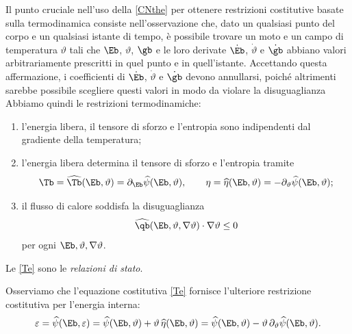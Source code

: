 Il punto cruciale nell'uso della \eqref{CNthe} per ottenere  restrizioni costitutive basate sulla termodinamica consiste nell'osservazione che, dato un qualsiasi punto del corpo e un qualsiasi istante di tempo, è possibile trovare un moto e un campo di temperatura $\vartheta$ tali che $\Eb$, $\vartheta$, $\gb$ e le loro derivate $\dot{\Eb}$, $\dot\vartheta$ e $\dot{\gb}$ abbiano valori  arbitrariamente prescritti in quel punto e in quell'istante.  Accettando questa affermazione, i coefficienti di $\dot\Eb$, $\dot \vartheta$ e $\dot\gb$ devono annullarsi, poiché altrimenti sarebbe possibile scegliere questi valori in modo da violare la disuguaglianza 
Abbiamo quindi le restrizioni termodinamiche:
\begin{enumerate}
	\item l'energia libera, il tensore di sforzo e l'entropia sono indipendenti dal gradiente della temperatura;
	\item l'energia libera determina il tensore di sforzo e l'entropia tramite 
	\begin{equation}\label{Te}
		\Tb =\widehat{\Tb}(\Eb, \vartheta)=\partial_\Eb \widehat{\psi}(\Eb, \vartheta), \qquad \eta= \widehat{\eta}(\Eb, \vartheta)=-\partial_\vartheta \widehat{\psi}(\Eb, \vartheta);
	\end{equation}
\item il flusso di calore soddisfa la disuguaglianza
\begin{equation}\label{qthe}
 \widehat{\qb}(\Eb, \vartheta, \nabla\vartheta)\cdot \nabla\vartheta\leq 0
\end{equation}
per ogni $\Eb, \vartheta, \nabla\vartheta$.
\end{enumerate}
Le \eqref{Te} sono le \textit{relazioni di stato}.

Osserviamo che l'equazione costitutiva \eqref{Te} fornisce l'ulteriore restrizione costitutiva per l'energia interna:
\begin{equation}\label{epsthe}
	\varepsilon=\widehat{\psi}(\Eb, \varepsilon)=\widehat{\psi}(\Eb, \vartheta)+\vartheta\,\widehat{\eta}(\Eb, \vartheta)=\widehat{\psi}(\Eb, \vartheta)-\vartheta\,\partial_\vartheta\widehat{\psi}(\Eb, \vartheta).
\end{equation}

